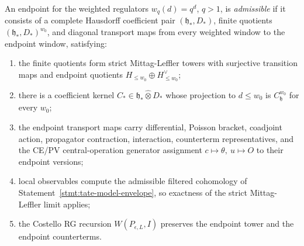 \begin{defn}
\label{defn:endpoint-admissible-coefficient-module}
  An endpoint for the weighted regulators \(w_q(d)=q^d\),
  \(q>1\), is \emph{admissible} if it consists of a complete
  Hausdorff coefficient pair \((\mathfrak h_\ast,D_\ast)\), finite
  quotients \((\mathfrak h_\ast,D_\ast)^{w_0}\), and diagonal
  transport maps from every weighted window to the endpoint window,
  satisfying:
  \begin{enumerate}[label=(E\arabic*)]
    \item the finite quotients form strict Mittag-Leffler towers with
      surjective transition maps and endpoint quotients
      \(H_{\leq w_0}\oplus H_{\leq w_0}^{\vee}\);
    \item there is a coefficient kernel
      \(C_\ast\in\mathfrak h_\ast\widehat\otimes D_\ast\) whose
      projection to \(d\leq w_0\) is
      \(C^{w_0}_{\mathfrak h}\) for every \(w_0\);
    \item the endpoint transport maps carry differential, Poisson
      bracket, coadjoint action, propagator contraction, interaction,
      counterterm representatives, and the CE/PV central-operation
      generator assignment \(c\mapsto\theta,\ u\mapsto O\) to their
      endpoint versions;
    \item local observables compute the admissible filtered cohomology
      of Statement~\ref{stmt:tate-model-envelope}, so exactness of
      the strict Mittag-Leffler limit applies;
    \item the Costello RG recursion \(W(P_{\epsilon,L},I)\) preserves
      the endpoint tower and the endpoint counterterms.
  \end{enumerate}
\end{defn}

